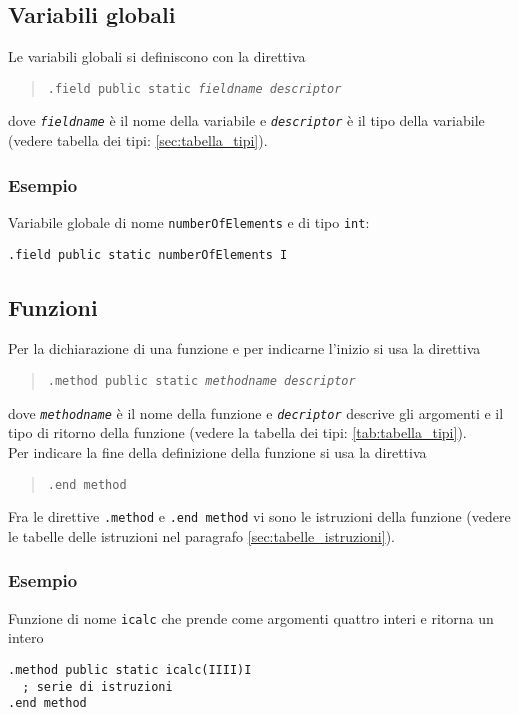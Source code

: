 \subsection{Variabili globali}
Le variabili globali si definiscono con la direttiva
\begin{quote}
  \texttt{.field public static \textit{fieldname} \textit{descriptor}}
\end{quote}
dove \texttt{\textit{fieldname}} \`e il nome della variabile e \texttt{\textit{descriptor}} \`e il tipo della variabile (vedere tabella dei tipi: \ref{sec:tabella_tipi}).
\subsubsection*{Esempio}
Variabile globale di nome \texttt{numberOfElements} e di tipo \texttt{int}:
\begin{verbatim}
.field public static numberOfElements I
\end{verbatim}

\subsection{Funzioni}
Per la dichiarazione di una funzione e per indicarne l'inizio si usa la direttiva
\begin{quote}
  \texttt{.method public static \textit{methodname} \textit{descriptor}}
\end{quote}
dove \texttt{\textit{methodname}} \`e il nome della funzione e \texttt{\textit{decriptor}} descrive gli argomenti e il tipo di ritorno della funzione (vedere la tabella dei tipi: \ref{tab:tabella_tipi}). \\
Per indicare la fine della definizione della funzione si usa la direttiva
\begin{quote}
  \texttt{.end method}
\end{quote}
Fra le direttive \texttt{.method} e \texttt{.end~method} vi sono le istruzioni della funzione (vedere le tabelle delle istruzioni nel paragrafo \ref{sec:tabelle_istruzioni}).
\subsubsection*{Esempio}
Funzione di nome \texttt{icalc} che prende come argomenti quattro interi e ritorna un intero
\begin{verbatim}
.method public static icalc(IIII)I
  ; serie di istruzioni
.end method
\end{verbatim}

